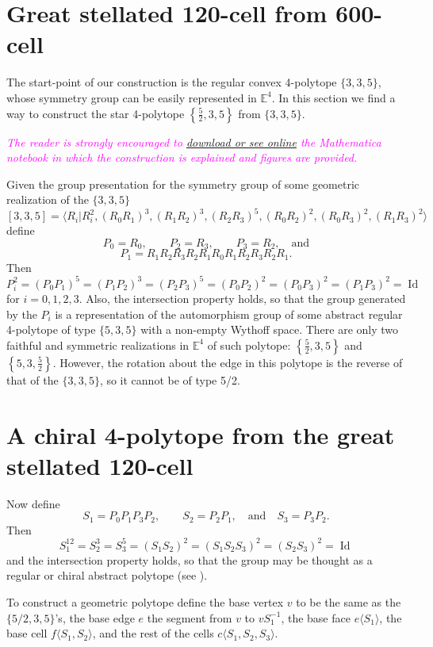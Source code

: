 \documentclass[spanish]{article}
\theoremstyle{definition}
\newcommand{\E}{\mathbb{E}}
\DeclareMathOperator{\Id}{Id}
\begin{document}
	\section{Great stellated 120-cell from 600-cell}
	The start-point of our construction is the regular convex 4-polytope $\{3,3,5\}$, whose symmetry group can be easily represented in $\E^4$.  In this section we find a way to construct the star 4-polytope $\left\{\frac{5}{2},3,5\right\}$ from $\{3,3,5\}$.
	
	\textcolor{magenta}{\textit{The reader is strongly encouraged to \href{https://www.wolframcloud.com/obj/dangcasanova/Published/chiral-4polytope.nb}{download or see online} the Mathematica notebook in which the construction is explained and figures are provided.}}
	
	Given the group presentation for the symmetry group of some geometric realization of the $\{3,3,5\}$
		\[[3,3,5]=\langle R_i|R_i^2,(R_0R_1)^3,(R_1R_2)^3,(R_2R_3)^5,(R_0R_2)^2,(R_0R_3)^2,(R_1R_3)^2\rangle\]
	define
		\[P_0=R_0,\qquad P_2=R_3,\qquad P_3=R_2,\quad\text{and}\]
		\[P_1=R_1R_2R_3R_2R_1R_0R_1R_2R_3R_2R_1.\]
	Then
		\[ P_i^2=(P_0P_1)^5=(P_1P_2)^3=(P_2P_3)^5=(P_0P_2)^2=(P_0P_3)^2=(P_1P_3)^2=\Id\]
	for $i=0,1,2,3$.
	Also, the intersection property holds, so that the group generated by the $P_i$ is a representation of the automorphism group of some abstract regular 4-polytope of type $\{5,3,5\}$ with a non-empty Wythoff space. There are only two faithful and symmetric realizations in $\mathbb{E}^4$ of such polytope: $\left\{\frac{5}{2},3,5\right\}$ and $\left\{5,3,\frac{5}{2}\right\}$. However, the rotation about the edge in this polytope is the reverse of that of the $\{3,3,5\}$, so it cannot be of type 5/2.
	

	\section{A chiral 4-polytope from the great stellated 120-cell}
	Now define
		\[S_1=P_0P_1P_3P_2,\qquad S_2=P_2P_1,\quad\text{and}\quad S_3=P_3P_2.\]
	Then
		\[S_1^{12}=S_2^3=S_3^5=(S_1S_2)^2=(S_1S_2S_3)^2=(S_2S_3)^2=\Id\]
	and the intersection property holds, so that the group may be thought as a regular or chiral abstract polytope (see \cite{schulte-chiral}).
	
	To construct a geometric polytope define the base vertex $v$ to be the same as the $\{5/2,3,5\}$'s, the base edge $e$ the segment from $v$ to $vS_1^{-1}$, the base face $e\langle S_1\rangle$, the base cell $f\langle S_1,S_2\rangle$, and the rest of the cells $c\langle S_1,S_2,S_3\rangle$.
	
\end{document}
